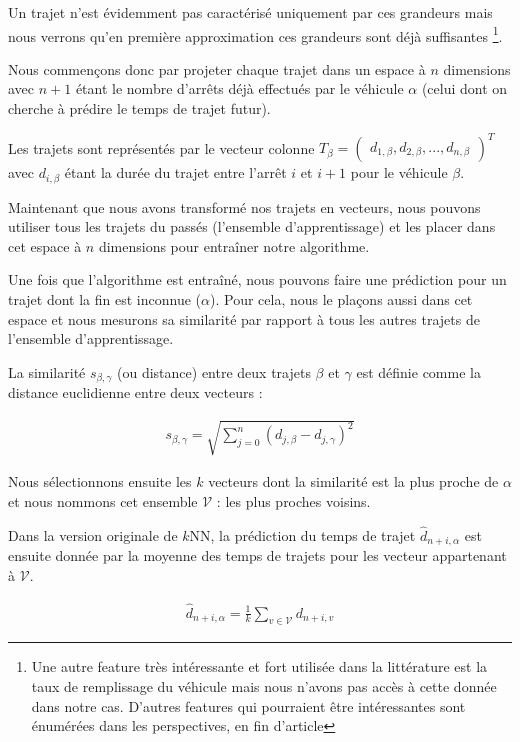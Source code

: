 \documentclass[letterpaper]{article}
\begin{document}
Un trajet n'est évidemment pas caractérisé uniquement par ces grandeurs mais nous verrons qu'en première approximation ces grandeurs sont déjà suffisantes \footnote{Une autre feature très intéressante et fort utilisée dans la littérature est la taux de remplissage du véhicule mais nous n'avons pas accès à cette donnée dans notre cas. D'autres features qui pourraient être intéressantes sont énumérées dans les perspectives, en fin d'article}.

Nous commençons donc par projeter chaque trajet dans un espace à $n$ dimensions avec $n+1$ étant le nombre d'arrêts déjà effectués par le véhicule $\alpha$ (celui dont on cherche à prédire le temps de trajet futur).

Les trajets sont représentés par le vecteur colonne
$T_{\beta} = \begin{pmatrix}d_{1,\beta}, d_{2,\beta}, ..., d_{n,\beta}\end{pmatrix}^{T}$
avec $d_{i,\beta}$ étant la durée du trajet entre l'arrêt $i$ et $i+1$ pour le véhicule $\beta$.

Maintenant que nous avons transformé nos trajets en vecteurs, nous pouvons utiliser tous les trajets du passés (l'ensemble d'apprentissage) et les placer dans cet espace à $n$ dimensions pour entraîner notre algorithme.

Une fois que l'algorithme est entraîné, nous pouvons faire une prédiction pour un trajet dont la fin est inconnue ($\alpha$). Pour cela, nous le plaçons aussi dans cet espace et nous mesurons sa similarité par rapport à tous les autres trajets de l'ensemble d'apprentissage.

La similarité $s_{\beta,\gamma}$ (ou distance) entre deux trajets $\beta$ et $\gamma$ est définie comme la distance euclidienne entre deux vecteurs :

\begin{eqnarray}
s_{\beta,\gamma} = \sqrt{\sum_{j=0}^{n}(d_{j,\beta} - d_{j,\gamma})^2}
\end{eqnarray}

Nous sélectionnons ensuite les $k$ vecteurs dont la similarité est la plus proche de $\alpha$ et nous nommons cet ensemble $\mathcal{V}$ : les plus proches voisins.

Dans la version originale de $k$NN, la prédiction du temps de trajet $\hat{d}_{n+i,\alpha}$ est ensuite donnée par la moyenne des temps de trajets pour les vecteur appartenant à $\mathcal{V}$.

\begin{eqnarray}
\hat{d}_{n+i,\alpha} = \frac{1}{k} \sum_{v \in \mathcal{V}}d_{n+i,v}
\end{eqnarray}
\end{document}
